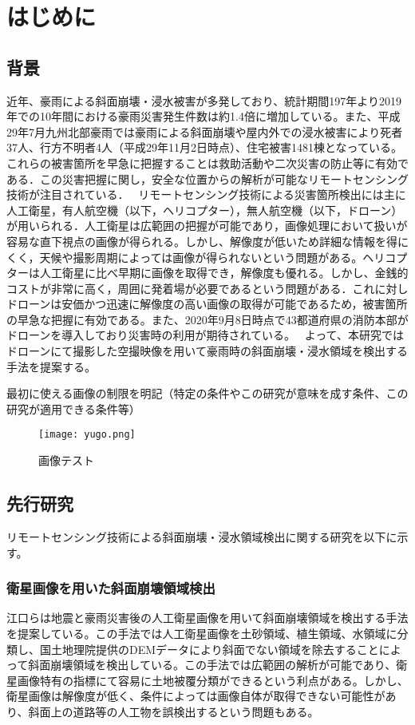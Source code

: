\documentclass[../Thesis]{subfiles}
\begin{document}
\chapter{はじめに}
\label{cha:はじめに}
\section{背景}
  近年、豪雨による斜面崩壊・浸水被害が多発しており、統計期間197年より2019年での10年間における豪雨災害発生件数は約1.4倍に増加している。\cite{web01}また、平成29年7月九州北部豪雨では豪雨による斜面崩壊や屋内外での浸水被害により死者37人、行方不明者4人（平成29年11月2日時点）、住宅被害1481棟となっている\cite{art01}。これらの被害箇所を早急に把握することは救助活動や二次災害の防止等に有効である．この災害把握に関し，安全な位置からの解析が可能なリモートセンシング技術が注目されている．
  \ リモートセンシング技術による災害箇所検出には主に人工衛星，有人航空機（以下，ヘリコプター），無人航空機（以下，ドローン）が用いられる．人工衛星は広範囲の把握が可能であり，画像処理において扱いが容易な直下視点の画像が得られる。しかし、解像度が低いため詳細な情報を得にくく，天候や撮影周期によっては画像が得られないという問題がある。ヘリコプターは人工衛星に比べ早期に画像を取得でき，解像度も優れる。しかし、金銭的コストが非常に高く，周囲に発着場が必要であるという問題がある．これに対しドローンは安価かつ迅速に解像度の高い画像の取得が可能であるため，被害箇所の早急な把握に有効である。また、2020年9月8日時点で43都道府県の消防本部がドローンを導入しており災害時の利用が期待されている。
  \ よって、本研究ではドローンにて撮影した空撮映像を用いて豪雨時の斜面崩壊・浸水領域を検出する手法を提案する。

  最初に使える画像の制限を明記（特定の条件やこの研究が意味を成す条件、この研究が適用できる条件等）

  \label{sec:背景}
  \begin{figure}[h]
    \centering
    \texttt{[image: yugo.png]}
    \caption{画像テスト}
    \label{fig:YUGO}
  \end{figure}
  \par


\section{先行研究}
  リモートセンシング技術による斜面崩壊・浸水領域検出に関する研究を以下に示す。
  
\subsection{衛星画像を用いた斜面崩壊領域検出}
  江口ら\cite{art01}は地震と豪雨災害後の人工衛星画像を用いて斜面崩壊領域を検出する手法を提案している。この手法では人工衛星画像を土砂領域、植生領域、水領域に分類し、国土地理院提供のDEMデータにより斜面でない領域を除去することによって斜面崩壊領域を検出している。この手法では広範囲の解析が可能であり、衛星画像特有の指標にて容易に土地被覆分類ができるという利点がある。しかし、衛星画像は解像度が低く、条件によっては画像自体が取得できない可能性があり、斜面上の道路等の人工物を誤検出するという問題もある。
\end{document}
